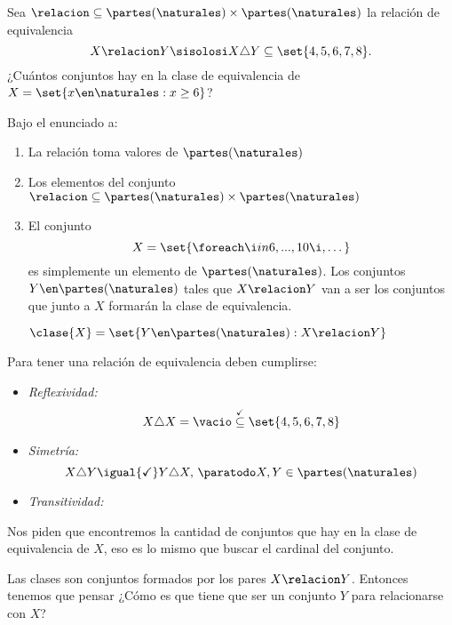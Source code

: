 \begin{enunciado}{\ejExtra}
  Sea $\relacion \subseteq \partes(\naturales) \times \partes(\naturales)$ la relación de equivalencia
  $$
    X \relacion Y \sisolosi X \triangle Y \subseteq \set{4,5,6,7,8}.
  $$
  ¿Cuántos conjuntos hay en la clase de equivalencia de $X = \set{x \en \naturales : x \geq 6}$?

\end{enunciado}

Bajo el enunciado a:
\begin{enumerate}
  \item La relación toma valores de $\partes(\naturales)$

  \item Los elementos del conjunto $\relacion \subseteq \partes(\naturales) \times \partes(\naturales)$

  \item El conjunto
        $$
          X = \set{\foreach \i in {6,...,10}{\i, }\dots}
        $$
        es simplemente un elemento de $\partes(\naturales)$. Los conjuntos $Y \en \partes(\naturales)$ tales que $X \relacion Y$
        van a ser los conjuntos que junto a $X$ formarán la clase de equivalencia.

        $ \clase{X} = \set{Y \en \partes(\naturales) : X \relacion Y}$
\end{enumerate}

Para tener una relación de equivalencia deben cumplirse:
\begin{itemize}
  \item \textit{Reflexividad:}
        $$
          X \triangle X = \vacio \stackrel{\checkmark}\subseteq \set{4,5,6,7,8}
        $$

  \item \textit{Simetría:}
        $$
          X \triangle Y \igual{\checkmark} Y \triangle X,\, \paratodo X,Y \in \partes(\naturales)
        $$
  \item \textit{Transitividad:}

        \hacer
\end{itemize}

Nos piden que encontremos la cantidad de conjuntos que hay en la clase de equivalencia de $X$, eso
es lo mismo que buscar el cardinal del conjunto.

Las clases son conjuntos formados por los pares $X \relacion Y$. Entonces tenemos que pensar ¿Cómo es que tiene que
ser un conjunto $Y$ para relacionarse con $X$?

\bigskip

